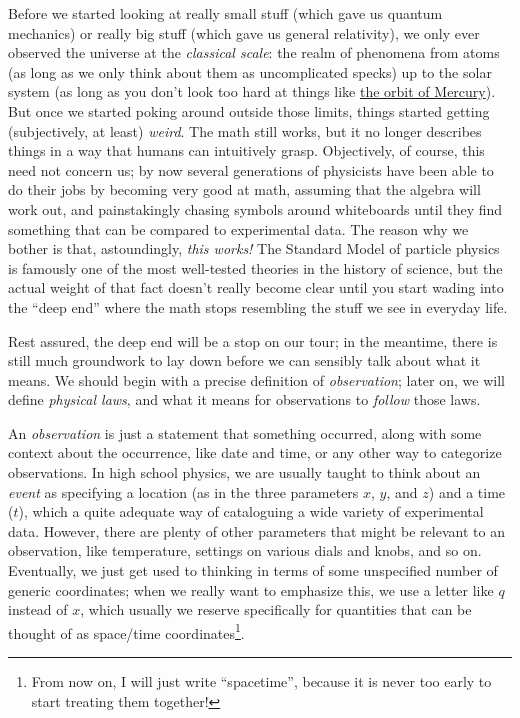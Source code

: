 Before we started looking at really small stuff (which gave us quantum mechanics) or really big stuff (which gave us general relativity), we only ever observed the universe at the \emph{classical scale}: the realm of phenomena from atoms (as long as we only think about them as uncomplicated specks) up to the solar system (as long as you don't look too hard at things like \href{https://en.wikipedia.org/wiki/Tests_of_general_relativity#Perihelion_precession_of_Mercury}{the orbit of Mercury}). But once we started poking around outside those limits, things started getting (subjectively, at least) \emph{weird}. The math still works, but it no longer describes things in a way that humans can intuitively grasp. Objectively, of course, this need not concern us; by now several generations of physicists have been able to do their jobs by becoming very good at math, assuming that the algebra will work out, and painstakingly chasing symbols around whiteboards until they find something that can be compared to experimental data. The reason why we bother is that, astoundingly, \emph{this works!} The Standard Model of particle physics is famously one of the most well-tested theories in the history of science, but the actual weight of that fact doesn't really become clear until you start wading into the ``deep end'' where the math stops resembling the stuff we see in everyday life.

Rest assured, the deep end will be a stop on our tour; in the meantime, there is still much groundwork to lay down before we can sensibly talk about what it means. We should begin with a precise definition of \emph{observation}; later on, we will define \emph{physical laws}, and what it means for observations to \emph{follow} those laws.

An \emph{observation} is just a statement that something occurred, along with some context about the occurrence, like date and time, or any other way to categorize observations. In high school physics, we are usually taught to think about an \emph{event} as specifying a location (as in the three parameters $x$, $y$, and $z$) and a time ($t$), which a quite adequate way of cataloguing a wide variety of experimental data. However, there are plenty of other parameters that might be relevant to an observation, like temperature, settings on various dials and knobs, and so on. Eventually, we just get used to thinking in terms of some unspecified number of generic coordinates; when we really want to emphasize this, we use a letter like $q$ instead of $x$, which usually we reserve specifically for quantities that can be thought of as space/time coordinates\footnote{From now on, I will just write ``spacetime'', because it is never too early to start treating them together!}.

